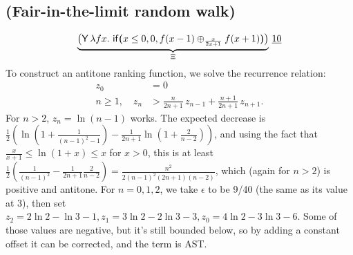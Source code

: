 \subsection*{ (Fair-in-the-limit random walk) \cite[\S 5.3]{DBLP:journals/pacmpl/McIverMKK18}}
\[
\underbrace{\big
(\tY \, \lambda f x .\ 
\tif{x \leq 0}{0}{f(x - 1) \oplus_{\frac{x}{2x+1}} f(x + 1)} \big)}_{\Xi} 
\, \underline{10}
\]
To construct an antitone ranking function, we solve the recurrence relation:
\begin{align*}
z_0 &= 0\\
n \geq 1, \quad z_n &> \textstyle \frac{n}{2n + 1} \, z_{n-1} + \frac{n+1}{2n + 1} \, z_{n+1}.
\end{align*}
For $n > 2$, $z_n = \ln(n-1)$ works. The expected decrease is $\frac 1 2(\ln(1+\frac 1 {(n-1)^2-1}) - \frac 1 {2n+1} \ln(1 + \frac 2 {n-2}))$, and using the fact that $\frac x {x+1} \leq \ln (1+x) \leq x$ for $x > 0$, this is at least $\frac 1 2(\frac 1 {(n-1)^2} - \frac 1 {2n + 1} \frac 2 {n-2}) = \frac {n^2}{2(n-1)^2(2n+1)(n-2)}$, which (again for $n > 2$) is positive and antitone. For $n = 0, 1, 2$, we take $\epsilon$ to be 9/40 (the same as its value at 3), then set $z_2 = 2 \ln 2 - \ln 3 - 1, z_1 = 3 \ln 2 - 2 \ln 3 - 3, z_0 = 4 \ln 2 - 3 \ln 3 - 6$. Some of those values are negative, but it's still bounded below, so by adding a constant offset it can be corrected, and the term is AST.



